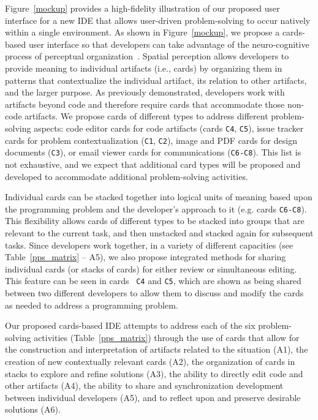 Figure~\ref{mockup} provides a high-fidelity illustration of our proposed user interface for a new IDE that allows user-driven problem-solving to occur natively within a single environment.
As shown in Figure~\ref{mockup}, we propose a cards-based user interface so that developers can take advantage of the neuro-cognitive process of perceptual organization~\cite{kimchi2003perceptual}.
Spatial perception allows developers to provide meaning to individual artifacts (i.e., cards) by organizing them in patterns that contextualize the individual artifact, its relation to other artifacts, and the larger purpose.
As previously demonstrated, developers work with artifacts beyond code and therefore require cards that accommodate those non-code artifacts.
We propose cards of different types to address different problem-solving aspects: code editor cards for code artifacts (cards \texttt{C4}, \texttt{C5}), issue tracker cards for problem contextualization (\texttt{C1}, \texttt{C2}), image and PDF cards for design documents (\texttt{C3}), or email viewer cards for communications (\texttt{C6-C8}).
This list is not exhaustive, and we expect that additional card types will be proposed and developed to accommodate additional problem-solving activities.

Individual cards can be stacked together into logical units of meaning based upon the programming problem and the developer's approach to it (e.g. cards \texttt{C6-C8}).
This flexibility allows cards of different types to be stacked into groups that are relevant to the current task, and then unstacked and stacked again for subsequent tasks.
Since developers work together, in a variety of different capacities (see Table~\ref{pps_matrix} -- A5), we also propose integrated methods for sharing individual cards (or stacks of cards) for either review or simultaneous editing.
This feature can be seen in cards ~\texttt{C4} and \texttt{C5}, which are shown as being shared between two different developers to allow them to discuss and modify the cards as needed to address a programming problem.

Our proposed cards-based IDE attempts to address each of the six problem-solving activities (Table~\ref{pps_matrix}) through the use of cards that allow for the construction and interpretation of artifacts related to the situation (A1), the creation of new contextually relevant cards (A2), the organization of cards in stacks to explore and refine solutions (A3), the ability to directly edit code and other artifacts (A4), the ability to share and synchronization development between individual developers (A5), and to reflect upon and preserve desirable solutions (A6).